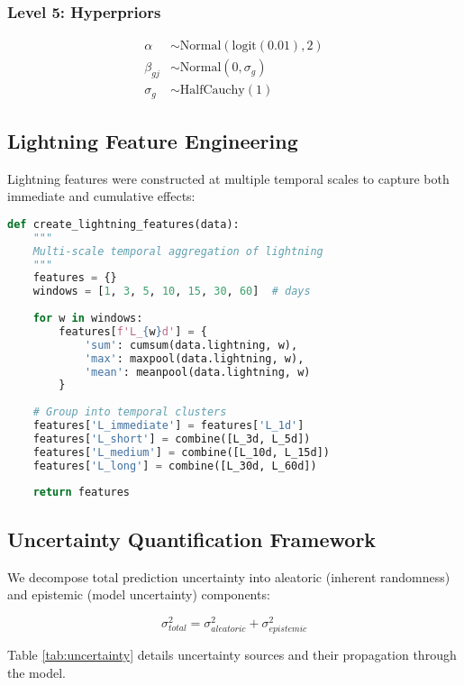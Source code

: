 \documentclass[11pt,a4paper]{article}
\begin{document}
\subsubsection{Level 5: Hyperpriors}
\begin{align}
\alpha &\sim \text{Normal}(\text{logit}(0.01), 2) \\
\beta_{gj} &\sim \text{Normal}(0, \sigma_g) \\
\sigma_g &\sim \text{HalfCauchy}(1)
\end{align}

\subsection{Lightning Feature Engineering}

Lightning features were constructed at multiple temporal scales to capture both immediate and cumulative effects:

\begin{lstlisting}[language=Python, caption=Lightning feature engineering pseudo-code]
def create_lightning_features(data):
    """
    Multi-scale temporal aggregation of lightning
    """
    features = {}
    windows = [1, 3, 5, 10, 15, 30, 60]  # days
    
    for w in windows:
        features[f'L_{w}d'] = {
            'sum': cumsum(data.lightning, w),
            'max': maxpool(data.lightning, w),
            'mean': meanpool(data.lightning, w)
        }
    
    # Group into temporal clusters
    features['L_immediate'] = features['L_1d']
    features['L_short'] = combine([L_3d, L_5d])
    features['L_medium'] = combine([L_10d, L_15d])
    features['L_long'] = combine([L_30d, L_60d])
    
    return features
\end{lstlisting}

\subsection{Uncertainty Quantification Framework}

We decompose total prediction uncertainty into aleatoric (inherent randomness) and epistemic (model uncertainty) components:

\begin{equation}
\sigma^2_{total} = \sigma^2_{aleatoric} + \sigma^2_{epistemic}
\end{equation}

Table \ref{tab:uncertainty} details uncertainty sources and their propagation through the model.
\end{document}
